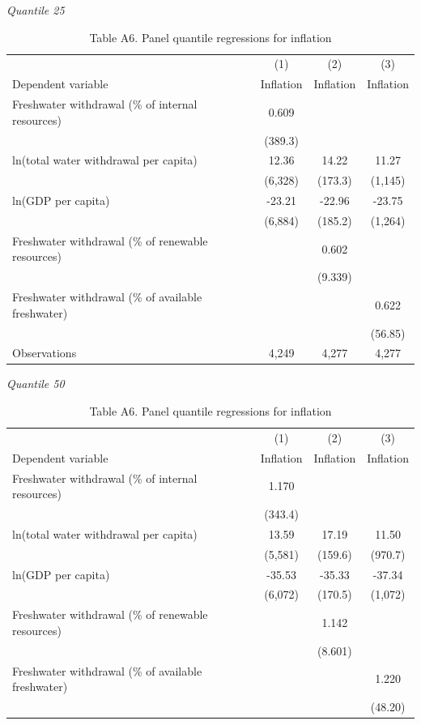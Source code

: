 \begin{table}[htbp]
\centering
\caption{Table A6. Panel quantile regressions for inflation}
\small
\textit{Quantile 25}\\
\begin{tabular}{lccc}
\hline
 & (1) & (2) & (3) \\
Dependent variable & Inflation & Inflation & Inflation \\
\hline
Freshwater withdrawal (\% of internal resources) & 0.609 &  &  \\
 & (389.3) &  &  \\
ln(total water withdrawal per capita) & 12.36 & 14.22 & 11.27 \\
 & (6,328) & (173.3) & (1,145) \\
ln(GDP per capita) & -23.21 & -22.96 & -23.75 \\
 & (6,884) & (185.2) & (1,264) \\
Freshwater withdrawal (\% of renewable resources) &  & 0.602 &  \\
 &  & (9.339) &  \\
Freshwater withdrawal (\% of available freshwater) &  &  & 0.622 \\
 &  &  & (56.85) \\
\hline
Observations & 4,249 & 4,277 & 4,277 \\
\hline
\end{tabular}
\vspace{0.75em}
\textit{Quantile 50}\\
\begin{tabular}{lccc}
\hline
 & (1) & (2) & (3) \\
Dependent variable & Inflation & Inflation & Inflation \\
\hline
Freshwater withdrawal (\% of internal resources) & 1.170 &  &  \\
 & (343.4) &  &  \\
ln(total water withdrawal per capita) & 13.59 & 17.19 & 11.50 \\
 & (5,581) & (159.6) & (970.7) \\
ln(GDP per capita) & -35.53 & -35.33 & -37.34 \\
 & (6,072) & (170.5) & (1,072) \\
Freshwater withdrawal (\% of renewable resources) &  & 1.142 &  \\
 &  & (8.601) &  \\
Freshwater withdrawal (\% of available freshwater) &  &  & 1.220 \\
 &  &  & (48.20) \\

\end{tabular}
\end{table}
